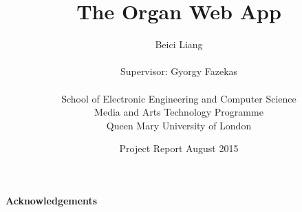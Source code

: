 \documentclass[oneside,12pt,a4paper]{report}
\title{\textbf{The Organ Web App}}
\author{\Large{Beici Liang}\\
\\
\Large{Supervisor: Gyorgy Fazekas} \\ 
\\
School of Electronic Engineering and Computer Science\\ 
Media and Arts Technology Programme\\
Queen Mary University of London}
\date{Project Report August 2015}
\makeatletter
\newcommand\ackname{Acknowledgements}
\newenvironment{acknowledgements}{%
      \titlepage
      \null\vfil
      \@beginparpenalty\@lowpenalty
      \begin{center}%
        \bfseries \ackname
        \@endparpenalty\@M
      \end{center}}%
     {\par\vfil\null\endtitlepage}
\newenvironment{acknowledgements}{%
      \if@twocolumn
        \section*{\abstractname}%
      \else
        \small
        \begin{center}%
          {\bfseries \ackname\vspace{-.5em}\vspace{\z@}}%
        \end{center}%
        \quotation
      \fi}
      {\if@twocolumn\else\endquotation\fi}
\makeatother
\begin{document}
 

\maketitle %

\begin{abstract}  %
\end{abstract}

\begin{acknowledgements} %
\end{acknowledgements}

\newpage %

\tableofcontents 	%
\listoffigures		%
\listoftables		%







\end{document}
